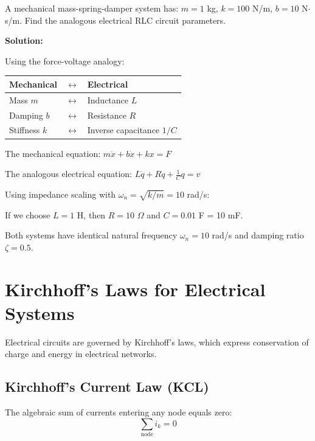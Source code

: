 \begin{examplebox}[title=Example 3.2: Domain Analogies]
A mechanical mass-spring-damper system has: $m = 1$ kg, $k = 100$ N/m, $b = 10$ N$\cdot$s/m. Find the analogous electrical RLC circuit parameters.

\textbf{Solution:}

Using the force-voltage analogy:
\begin{center}
\begin{tabular}{lcl}
Mechanical & $\leftrightarrow$ & Electrical \\
\hline
Mass $m$ & $\leftrightarrow$ & Inductance $L$ \\
Damping $b$ & $\leftrightarrow$ & Resistance $R$ \\
Stiffness $k$ & $\leftrightarrow$ & Inverse capacitance $1/C$ \\
\end{tabular}
\end{center}

The mechanical equation: $m\ddot{x} + b\dot{x} + kx = F$

The analogous electrical equation: $L\ddot{q} + R\dot{q} + \frac{1}{C}q = v$

Using impedance scaling with $\omega_n = \sqrt{k/m} = 10$ rad/s:

If we choose $L = 1$ H, then $R = 10$ $\Omega$ and $C = 0.01$ F = 10 mF.

Both systems have identical natural frequency $\omega_n = 10$ rad/s and damping ratio $\zeta = 0.5$.
\end{examplebox}

\section{Kirchhoff's Laws for Electrical Systems}
\label{sec:kirchhoffs_laws}

Electrical circuits are governed by Kirchhoff's laws, which express conservation of charge and energy in electrical networks.

\subsection{Kirchhoff's Current Law (KCL)}

The algebraic sum of currents entering any node equals zero:
\begin{equation}
\sum_{\text{node}} i_k = 0
\label{eq:kcl}
\end{equation}

